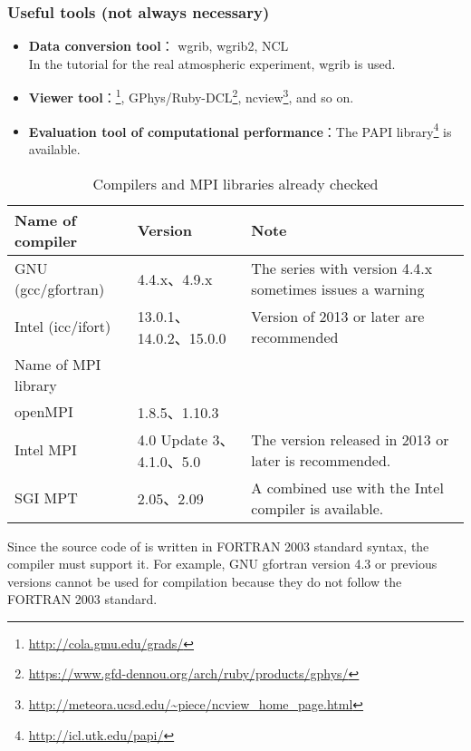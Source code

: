\subsubsection{Useful tools (not always necessary)}
\begin{itemize}
  \item {\bf Data conversion tool}： wgrib, wgrib2, NCL\\
  In the tutorial for the real atmospheric experiment, wgrib is used.
  \item {\bf Viewer tool}：\grads \footnote{\url{http://cola.gmu.edu/grads/}},
  GPhys/Ruby-DCL\footnote{\url{https://www.gfd-dennou.org/arch/ruby/products/gphys/}},
  ncview\footnote{\url{http://meteora.ucsd.edu/~piece/ncview\_home\_page.html}}, and so on.
  \item {\bf Evaluation tool of computational performance}：The PAPI library\footnote{\url{http://icl.utk.edu/papi/}} is available.
\end{itemize}


\begin{table}[tb]
\begin{center}
\caption{Compilers and MPI libraries already checked}
\begin{tabularx}{150mm}{|l|l|X|} \hline
 \rowcolor[gray]{0.9} Name of compiler & Version & Note \\ \hline
 GNU (gcc/gfortran)    & 4.4.x、4.9.x           & The series with version 4.4.x sometimes issues a warning \\ \hline
 Intel (icc/ifort)     & 13.0.1、14.0.2、15.0.0  & Version of 2013 or later are recommended \\ \hline
 \rowcolor[gray]{0.9} Name of MPI library &  &  \\ \hline
 openMPI   & 1.8.5、1.10.3            & \\ \hline
 Intel MPI & 4.0 Update 3、4.1.0、5.0 & The version released in 2013 or later is recommended.\\ \hline
 SGI MPT   & 2.05、2.09               & A combined use with the Intel compiler is available. \\ \hline
\end{tabularx}
\label{tab:compatible_compiler}
\end{center}
\end{table}

Since the source code of \scalelib is  written in FORTRAN 2003 standard syntax, the compiler must support it. For example, GNU gfortran version 4.3 or previous versions cannot be used for \scalelib compilation because they do not follow the FORTRAN 2003 standard.

